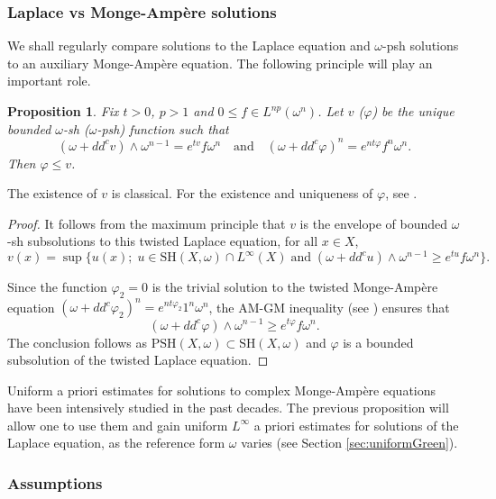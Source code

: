 \documentclass[JEP,XML,SOM,Unicode,published]{cedram}
\newtheorem{prop}[theorem]{Proposition}
\theoremstyle{definition}
\let\f\varphi
\newcommand \PSH {\mathrm{PSH}}
\newcommand \SH {\mathrm{SH}}
\begin{document}
\subsubsection{Laplace vs Monge-Ampère solutions} \label{sec:LaplacevsMA}

We shall regularly compare solutions to the Laplace equation
and $\omega$-psh solutions to an auxiliary Monge-Ampère equation.
The following principle will play an important role.

\begin{prop} \label{pro:comparisonLMA}
Fix $t>0$, $p>1$ and $0 \leq f \in L^{np}(\omega^n)$. Let $v$ (\resp $\f$) be the unique bounded $\omega$-sh (\resp $\omega$-psh)
function such that
\[
(\omega+dd^c v) \wedge \omega^{n-1}=e^{tv} f \omega^n
\quad \text{and} \quad
(\omega+dd^c \f)^n = e^{nt\f} f^n \omega^n.
\]
Then $\f \leq v$.
\end{prop}

The existence of $v$ is classical.
For the existence and uniqueness of $\f$, see \cite{GZbook}.

\begin{proof}
It follows from the maximum principle that $v$ is the envelope of bounded $\omega$-sh subsolutions to this twisted Laplace equation, \ie for all $x \in X$,
\[
v(x)=\sup \bigl\{ u(x); \; u \in \SH(X,\omega) \cap L^{\infty}(X)
\; \text{and} \;
(\omega+dd^c u) \wedge \omega^{n-1} \geq e^{tu} f \omega^n \bigr\}.
\]

Since the function $\f_2=0$ is the trivial solution to the twisted Monge-Ampère equation
$(\omega+dd^c \f_2)^n = e^{nt\f_2} 1^n \omega^n$,
the AM-GM inequality (see \cite[Th.\,2.12]{DK14}) ensures that
\[
(\omega+dd^c \f) \wedge \omega^{n-1} \geq e^{t \f} f \omega^n.
\]
The conclusion follows as $\PSH(X,\omega) \subset \SH(X,\omega)$
and $\f$ is a bounded subsolution of the twisted Laplace equation.
\end{proof}

Uniform a priori estimates for solutions to complex Monge-Ampère equations
have been intensively studied in the past decades. The previous proposition
will allow one to use them and gain uniform $L^{\infty}$ a priori estimates
for solutions of the Laplace equation, as the reference form $\omega$ varies
(see Section \ref{sec:uniformGreen}).

 \label{sec:uniformMA}

\subsubsection{Assumptions}
\end{document}
